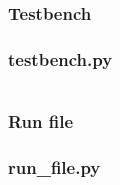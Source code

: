 \subsubsection{Testbench}
\label{anexe:gw_demo:testbench}
\subsubsection*{testbench.py}
\inputminted[autogobble]{python}{anexes/Gw_demo/testbench.py}

\subsubsection{Run file}
\label{anexe:gw_demo:run_file}
\subsubsection*{run\_file.py}
\inputminted[autogobble]{python}{anexes/Gw_demo/run_microsar.py}
